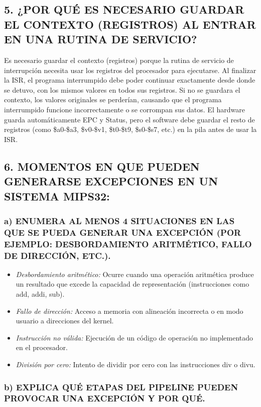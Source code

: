 \documentclass[12pt]{article}
\begin{document}
\subsection*{5. ¿POR QUÉ ES NECESARIO GUARDAR EL CONTEXTO (REGISTROS) AL ENTRAR EN UNA RUTINA DE SERVICIO?}

Es necesario guardar el contexto (registros) porque la rutina de servicio de interrupción necesita usar los registros del procesador para ejecutarse. Al finalizar la ISR, el programa interrumpido debe poder continuar exactamente desde donde se detuvo, con los mismos valores en todos sus registros. Si no se guardara el contexto, los valores originales se perderían, causando que el programa interrumpido funcione incorrectamente o se corrompan sus datos. El hardware guarda automáticamente EPC y Status, pero el software debe guardar el resto de registros (como \$a0-\$a3, \$v0-\$v1, \$t0-\$t9, \$s0-\$s7, etc.) en la pila antes de usar la ISR.

\subsection*{6. MOMENTOS EN QUE PUEDEN GENERARSE EXCEPCIONES EN UN SISTEMA MIPS32:}

\subsubsection*{a) ENUMERA AL MENOS 4 SITUACIONES EN LAS QUE SE PUEDA GENERAR UNA EXCEPCIÓN (POR EJEMPLO: DESBORDAMIENTO ARITMÉTICO, FALLO DE DIRECCIÓN, ETC.).}

\begin{itemize}
    \item \textit{Desbordamiento aritmético:} Ocurre cuando una operación aritmética produce un resultado que excede la capacidad de representación (instrucciones como add, addi, sub).
    \item \textit{Fallo de dirección:} Acceso a memoria con alineación incorrecta o en modo usuario a direcciones del kernel.
    \item \textit{Instrucción no válida:} Ejecución de un código de operación no implementado en el procesador.
    \item \textit{División por cero:} Intento de dividir por cero con las instrucciones div o divu.
\end{itemize}

\subsubsection*{b) EXPLICA QUÉ ETAPAS DEL PIPELINE PUEDEN PROVOCAR UNA EXCEPCIÓN Y POR QUÉ.}
\end{document}
